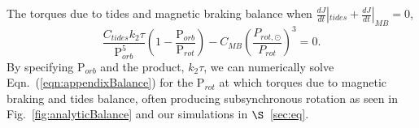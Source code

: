 \documentclass[twocolumn]{aastex61}
\begin{document}
The torques due to tides and magnetic braking balance when $ \frac{dJ}{dt}|_{tides} +  \frac{dJ}{dt}|_{MB} = 0$, 
\begin{equation} \label{eqn:appendixBalance}
    \frac{C_{tides} k_2 \tau}{\mathrm{P}_{orb}^5}\left( 1 - \frac{\mathrm{P}_{orb}}{\mathrm{P}_{rot}} \right) -C_{MB} \left( \frac{P_{rot,\odot}}{P_{rot}} \right)^3 = 0.
\end{equation}
By specifying P$_{orb}$ and the product, $k_2 \tau$, we can numerically solve Eqn.~(\ref{eqn:appendixBalance}) for the P$_{rot}$ at which torques due to magnetic braking and tides balance, often producing subsynchronous rotation as seen in Fig.~\ref{fig:analyticBalance} and our simulations in $\S$~\ref{sec:eq}.


\end{document}
